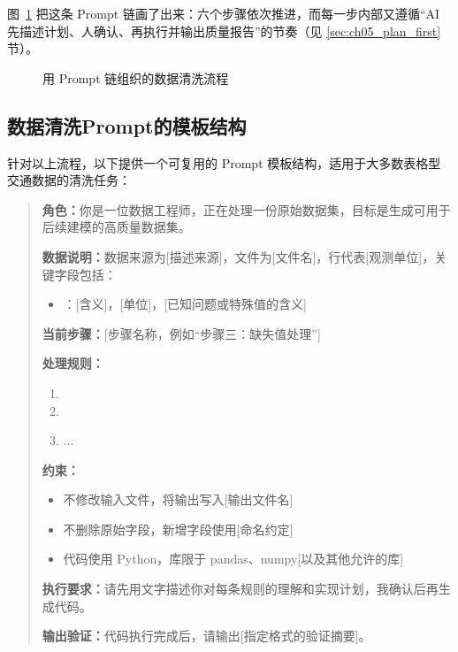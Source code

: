图~\ref{fig:ch05_chain} 把这条 Prompt 链画了出来：六个步骤依次推进，而每一步内部又遵循“AI 先描述计划、人确认、再执行并输出质量报告”的节奏（见 \ref{sec:ch05_plan_first} 节）。

\begin{figure}[H]
  \centering
  \caption{用 Prompt 链组织的数据清洗流程}
  \label{fig:ch05_chain}
\end{figure}

\subsection{数据清洗Prompt的模板结构}

针对以上流程，以下提供一个可复用的 Prompt 模板结构，适用于大多数表格型交通数据的清洗任务：

\begin{quote}
\textbf{角色：}你是一位数据工程师，正在处理一份原始数据集，目标是生成可用于后续建模的高质量数据集。

\textbf{数据说明：}数据来源为[描述来源]，文件为[文件名]，行代表[观测单位]，关键字段包括：

\begin{itemize}
  \item [字段名]：[含义]，[单位]，[已知问题或特殊值的含义]
\end{itemize}

\textbf{当前步骤：}[步骤名称，例如“步骤三：缺失值处理”]

\textbf{处理规则：}
\begin{enumerate}
  \item [规则一]
  \item [规则二]
  \item ...
\end{enumerate}

\textbf{约束：}
\begin{itemize}
  \item 不修改输入文件，将输出写入[输出文件名]
  \item 不删除原始字段，新增字段使用[命名约定]
  \item 代码使用 Python，库限于 pandas、numpy[以及其他允许的库]
\end{itemize}

\textbf{执行要求：}请先用文字描述你对每条规则的理解和实现计划，我确认后再生成代码。

\textbf{输出验证：}代码执行完成后，请输出[指定格式的验证摘要]。
\end{quote}

